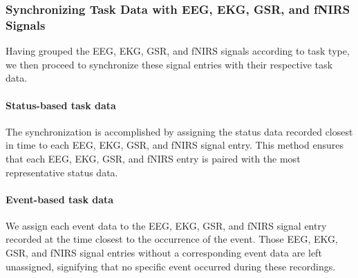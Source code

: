 \subsubsection{Synchronizing Task Data with EEG, EKG, GSR, and fNIRS Signals}

Having grouped the EEG, EKG, GSR, and fNIRS signals according to task type, we then proceed to synchronize these signal entries with their respective task data.

\paragraph{Status-based task data} The synchronization is accomplished by assigning the status data recorded closest in time to each EEG, EKG, GSR, and fNIRS signal entry. This method ensures that each EEG, EKG, GSR, and fNIRS entry is paired with the most representative status data.

\paragraph{Event-based task data} We assign each event data to the EEG, EKG, GSR, and fNIRS signal entry recorded at the time closest to the occurrence of the event. Those EEG, EKG, GSR, and fNIRS signal entries without a corresponding event data are left unassigned, signifying that no specific event occurred during these recordings.
